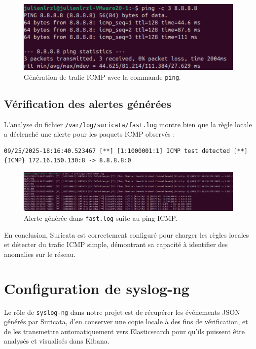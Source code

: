 \begin{figure}[H]
    \centering
    \includegraphics[width=0.9\linewidth]{assets/figures/ping-icmp.png}
    \caption{Génération de trafic ICMP avec la commande \texttt{ping}.}
\end{figure}

\subsection{Vérification des alertes générées}
L’analyse du fichier \texttt{/var/log/suricata/fast.log} montre bien que la règle locale a déclenché une alerte pour les paquets ICMP observés :

\begin{lstlisting}[style=bashstyle]
09/25/2025-18:16:40.523467 [**] [1:1000001:1] ICMP test detected [**] {ICMP} 172.16.150.130:8 -> 8.8.8.8:0
\end{lstlisting}


\begin{figure}[H]
    \centering
    \includegraphics[width=0.9\linewidth]{assets/figures/icmp-alert.png}
    \caption{Alerte générée dans \texttt{fast.log} suite au ping ICMP.}
\end{figure}

\bigskip
En conclusion, Suricata est correctement configuré pour charger les règles locales et détecter du trafic ICMP simple, démontrant sa capacité à identifier des anomalies sur le réseau.

\section{Configuration de syslog-ng}

Le rôle de \texttt{syslog-ng} dans notre projet est de récupérer les événements JSON générés par Suricata, d'en conserver une copie locale à des fins de vérification, et de les transmettre automatiquement vers Elasticsearch pour qu'ils puissent être analysés et visualisés dans Kibana.

